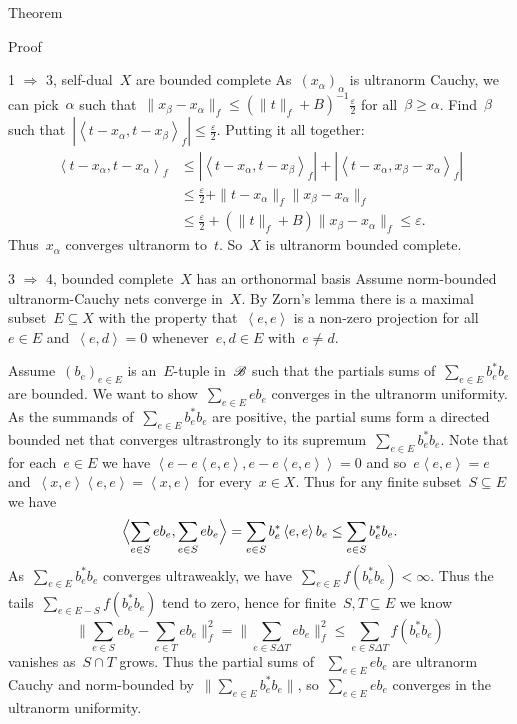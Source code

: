 \documentclass[b]{subfiles}
\begin{document}
\begin{parsec}
\begin{point}{Theorem}
\begin{point}{Proof}
\begin{point}{1 $\Rightarrow$ 3, self-dual~$X$ are bounded complete}
As~$(x_\alpha)_\alpha$ is ultranorm Cauchy,
we can pick~$\alpha$ such that~$\|x_\beta - x_\alpha\|_f \leq (\|t\|_f + B)^{-1}
\frac{\varepsilon}{2}$ for all~$\beta \geq \alpha$.
Find~$\beta$ such that~$|\left<t-x_\alpha,t-x_\beta\right>_f|
    \leq \frac{\varepsilon}{2}$.
Putting it all together:
\begin{align*}
    \left<t-x_\alpha,t-x_\alpha\right>_f
    & \leq |\left<t-x_\alpha,t-x_\beta\right>_f|
    + |\left<t-x_\alpha,x_\beta-x_\alpha\right>_f| \\
    & \leq \frac{\varepsilon}{2}
    + \| t- x_\alpha \|_f \|x_\beta - x_\alpha\|_f\\
    & \leq \frac{\varepsilon}{2}
    + (\| t\|_f + B) \|x_\beta - x_\alpha\|_f \leq \varepsilon.
\end{align*}
Thus~$x_\alpha$ converges ultranorm to~$t$.
So~$X$ is ultranorm bounded complete.
\end{point}
\begin{point}{3
    $\Rightarrow$ 4, bounded complete~$X$ has an orthonormal basis}
    Assume norm-bounded ultranorm-Cauchy nets converge in~$X$.
By Zorn's lemma there is a maximal subset~$E \subseteq X$
    with the property that~$\left<e,e\right>$ is a non-zero projection
    for all~$e\in E$
    and~$\left<e,d\right>=0$ whenever~$e,d \in E$ with~$e \neq d$.

Assume~$(b_e)_{e \in E}$ is an~$E$-tuple in~$\mathscr{B}$
such that the partials sums of~$\sum_{e \in E} b_e^*b_e$ are bounded.
We want to show~$\sum_{e \in E} e b_e$ converges in the ultranorm
    uniformity.
As the summands of~$\sum_{e \in E}b_e^*b_e$ are positive,
    the partial sums form a directed bounded net
    that converges ultrastrongly
    to its supremum~$\sum_{e \in E} b_e^*b_e$.
Note that for each~$e \in E$
we have
$\left<e-e\left<e,e\right>,e-e\left<e,e\right>\right> = 0$
and so~$e \left<e,e\right> = e$
and~$\left<x,e\right>\left<e,e\right> = \left<x,e\right>$
for every~$x \in X$.
Thus for any finite subset~$S \subseteq E$
we have
\begin{equation*}
    \Bigl<\sum_{e \in S} eb_e, \sum_{e \in S} eb_e\Bigr>
    = \sum_{e \in S} b_e^* \left<e,e\right>b_e \leq \sum_{e \in S} b_e^*b_e.
\end{equation*}
As~$\sum_{e \in E} b^*_eb_e$ converges ultraweakly,
we have~$\sum_{e \in E} f(b^*_eb_e) < \infty$.
Thus the tails~$\sum_{e \in E - S} f(b_e^*b_e)$ tend to zero, hence for finite~$S,T\subseteq E$ we know
\begin{equation*}
    \bigl\| \sum_{e \in S} eb_e - \sum_{e\in T} eb_e \bigr\|_f^2
        = \bigl\| \sum_{e \in S\Delta T} eb_e  \bigr\|_f^2
        \leq \sum_{e \in S\Delta T} f(b_e^*b_e)
\end{equation*}
vanishes as~$S \cap T$ grows.
Thus the partial sums of ~$\sum_{e \in E} eb_e$ are ultranorm Cauchy
and norm-bounded by~$\| \sum_{e \in E} b_e^*b_e \|$,
so~$\sum_{e \in E} eb_e$ converges in the ultranorm uniformity.


\end{point}
\end{point}
\end{point}
\end{parsec}
\end{document}
